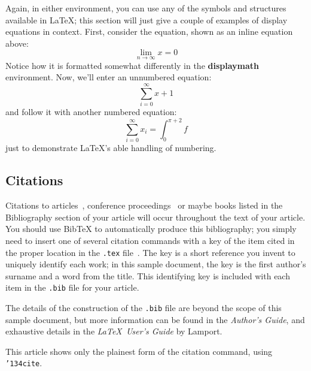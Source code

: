 Again, in either environment, you can use any of the symbols
and structures available in \LaTeX\@; this section will just
give a couple of examples of display equations in context.
First, consider the equation, shown as an inline equation above:
\begin{equation}
  \lim_{n\rightarrow \infty}x=0
\end{equation}
Notice how it is formatted somewhat differently in
the \textbf{displaymath}
environment.  Now, we'll enter an unnumbered equation:
\begin{displaymath}
  \sum_{i=0}^{\infty} x + 1
\end{displaymath}
and follow it with another numbered equation:
\begin{equation}
  \sum_{i=0}^{\infty}x_i=\int_{0}^{\pi+2} f
\end{equation}
just to demonstrate \LaTeX's able handling of numbering.

\subsection{Citations}
Citations to articles~\cite{bowman:reasoning,
clark:pct, braams:babel, herlihy:methodology},
conference proceedings~\cite{clark:pct} or maybe
books \cite{Lamport:LaTeX, salas:calculus} listed
in the Bibliography section of your
article will occur throughout the text of your article.
You should use BibTeX to automatically produce this bibliography;
you simply need to insert one of several citation commands with
a key of the item cited in the proper location in
the \texttt{.tex} file~\cite{Lamport:LaTeX}.
The key is a short reference you invent to uniquely
identify each work; in this sample document, the key is
the first author's surname and a
word from the title.  This identifying key is included
with each item in the \texttt{.bib} file for your article.

The details of the construction of the \texttt{.bib} file
are beyond the scope of this sample document, but more
information can be found in the \textit{Author's Guide},
and exhaustive details in the \textit{\LaTeX\ User's
Guide} by Lamport.

This article shows only the plainest form
of the citation command, using \texttt{{\char'134}cite}.


